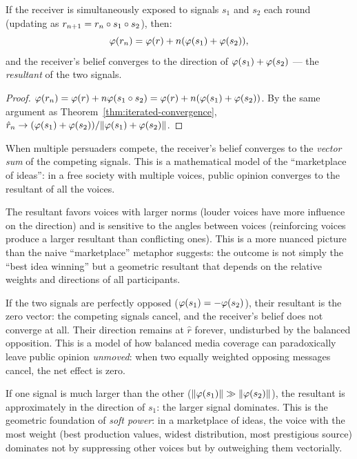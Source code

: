 \begin{theorem}
\label{thm:competing}
If the receiver is simultaneously exposed to signals $s_1$ and $s_2$ each
round (updating as $r_{n+1} = r_n \circ s_1 \circ s_2$), then:
\[
  \varphi(r_n) = \varphi(r) + n(\varphi(s_1) + \varphi(s_2)),
\]
and the receiver's belief converges to the direction of $\varphi(s_1) +
\varphi(s_2)$ --- the \emph{resultant} of the two signals.
\end{theorem}

\begin{proof}
$\varphi(r_n) = \varphi(r) + n\varphi(s_1 \circ s_2) = \varphi(r) +
n(\varphi(s_1) + \varphi(s_2))$. By the same argument as
Theorem~\ref{thm:iterated-convergence}, $\hat{r}_n \to (\varphi(s_1) +
\varphi(s_2)) / \lVert \varphi(s_1) + \varphi(s_2) \rVert$.
\end{proof}

\begin{interpretation}
\label{interp:marketplace}
When multiple persuaders compete, the receiver's belief converges to the
\emph{vector sum} of the competing signals. This is a mathematical model of
the ``marketplace of ideas'': in a free society with multiple voices, public
opinion converges to the resultant of all the voices.

The resultant favors voices with larger norms (louder voices have more
influence on the direction) and is sensitive to the angles between voices
(reinforcing voices produce a larger resultant than conflicting ones). This
is a more nuanced picture than the naive ``marketplace'' metaphor suggests:
the outcome is not simply the ``best idea winning'' but a geometric resultant
that depends on the relative weights and directions of all participants.

If the two signals are perfectly opposed ($\varphi(s_1) = -\varphi(s_2)$), their
resultant is the zero vector: the competing signals cancel, and the receiver's
belief does not converge at all. Their direction remains at $\hat{r}$ forever,
undisturbed by the balanced opposition. This is a model of how balanced media
coverage can paradoxically leave public opinion \emph{unmoved}: when two
equally weighted opposing messages cancel, the net effect is zero.

If one signal is much larger than the other ($\lVert \varphi(s_1) \rVert \gg
\lVert \varphi(s_2) \rVert$), the resultant is approximately in the direction of $s_1$:
the larger signal dominates. This is the geometric foundation of \emph{soft
power}: in a marketplace of ideas, the voice with the most weight (best
production values, widest distribution, most prestigious source) dominates not
by suppressing other voices but by outweighing them vectorially.
\end{interpretation}


